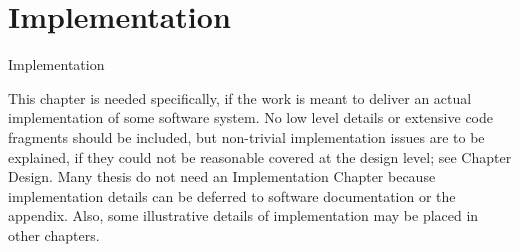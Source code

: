 \chapter{Implementation}
\label{Implementation}

Implementation

This chapter is needed specifically, if the work is meant to deliver an actual implementation of some software system. No low level details or extensive code fragments should be included, but non-trivial implementation issues are to be explained, if they could not be reasonable covered at the design level; see Chapter Design. Many thesis do not need an Implementation Chapter because implementation details can be deferred to software documentation or the appendix. Also, some illustrative details of implementation may be placed in other chapters.